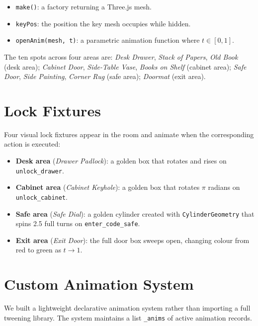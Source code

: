 \documentclass[12pt, a4paper]{report}
\begin{document}
\begin{itemize}[leftmargin=1.5em]
  \item \texttt{make()}: a factory returning a Three.js mesh.
  \item \texttt{keyPos}: the position the key mesh occupies while hidden.
  \item \texttt{openAnim(mesh, t)}: a parametric animation function where
        $t \in [0,1]$.
\end{itemize}

The ten spots across four areas are: \textit{Desk Drawer}, \textit{Stack of
Papers}, \textit{Old Book} (desk area); \textit{Cabinet Door}, \textit{Side-Table
Vase}, \textit{Books on Shelf} (cabinet area); \textit{Safe Door},
\textit{Side Painting}, \textit{Corner Rug} (safe area); \textit{Doormat}
(exit area).

\section{Lock Fixtures}
\label{sec:lockfixtures}

Four visual lock fixtures appear in the room and animate when the corresponding
action is executed:

\begin{itemize}[leftmargin=1.5em]
  \item \textbf{Desk area} (\textit{Drawer Padlock}): a golden box that rotates
        and rises on \texttt{unlock\_drawer}.
  \item \textbf{Cabinet area} (\textit{Cabinet Keyhole}): a golden box that
        rotates $\pi$ radians on \texttt{unlock\_cabinet}.
  \item \textbf{Safe area} (\textit{Safe Dial}): a golden cylinder created with
        \texttt{CylinderGeometry} that spins 2.5 full turns on
        \texttt{enter\_code\_safe}.
  \item \textbf{Exit area} (\textit{Exit Door}): the full door box sweeps open,
        changing colour from red to green as $t \to 1$.
\end{itemize}

\section{Custom Animation System}
\label{sec:animations}

We built a lightweight declarative animation system rather than importing a
full tweening library.  The system maintains a list \texttt{\_anims} of active
animation records.
\end{document}
